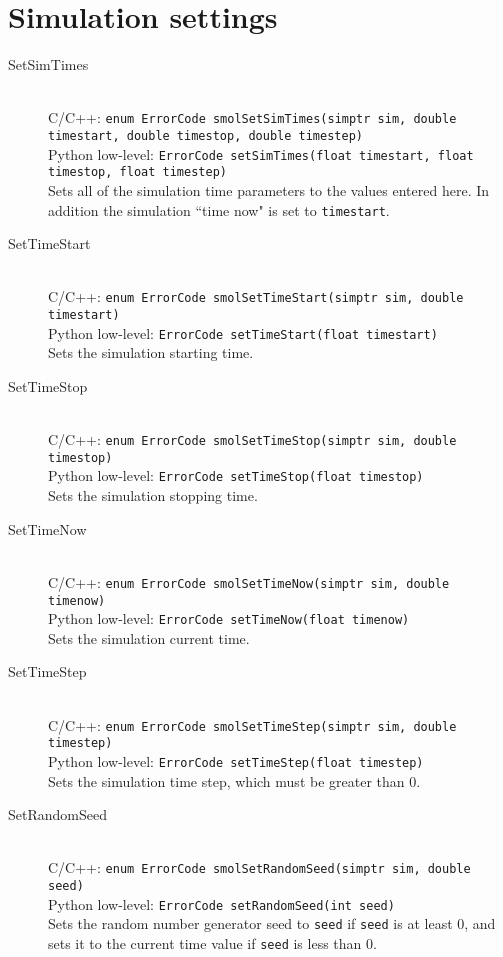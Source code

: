 \documentclass {book}
\newcommand {\ttt} {\texttt}
\begin{document}
\section{Simulation settings}

\begin{description}

\item[SetSimTimes]
\hfill \\
C/C++: \ttt{enum ErrorCode smolSetSimTimes(simptr sim, double timestart, double timestop, double timestep)}\\
Python low-level: \ttt{ErrorCode setSimTimes(float timestart, float timestop, float timestep)}\\
Sets all of the simulation time parameters to the values entered here. In addition the simulation ``time now" is set to \ttt{timestart}.

\item[SetTimeStart]
\hfill \\
C/C++: \ttt{enum ErrorCode smolSetTimeStart(simptr sim, double timestart)}\\
Python low-level: \ttt{ErrorCode setTimeStart(float timestart)}\\
Sets the simulation starting time.

\item[SetTimeStop]
\hfill \\
C/C++: \ttt{enum ErrorCode smolSetTimeStop(simptr sim, double timestop)}\\
Python low-level: \ttt{ErrorCode setTimeStop(float timestop)}\\
Sets the simulation stopping time.

\item[SetTimeNow]
\hfill \\
C/C++: \ttt{enum ErrorCode smolSetTimeNow(simptr sim, double timenow)}\\
Python low-level: \ttt{ErrorCode setTimeNow(float timenow)}\\
Sets the simulation current time.

\item[SetTimeStep]
\hfill \\
C/C++: \ttt{enum ErrorCode smolSetTimeStep(simptr sim, double timestep)}\\
Python low-level: \ttt{ErrorCode setTimeStep(float timestep)}\\
Sets the simulation time step, which must be greater than 0.

\item[SetRandomSeed]
\hfill \\
C/C++: \ttt{enum ErrorCode smolSetRandomSeed(simptr sim, double seed)}\\
Python low-level: \ttt{ErrorCode setRandomSeed(int seed)}\\
Sets the random number generator seed to \ttt{seed} if \ttt{seed} is at least 0, and sets it to the current time value if \ttt{seed} is less than 0.


\end{description}
\end{document}
